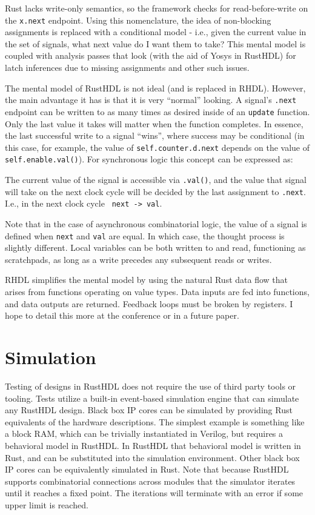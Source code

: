 \documentclass[sigplan,screen,sigconf]{acmart}
\begin{document}
Rust lacks write-only semantics, so the framework checks for read-before-write on the \verb|x.next| endpoint.  Using this nomenclature, the idea of non-blocking assignments is replaced with a conditional model - i.e., given the current value in the set of signals, what next value do I want them to take?  This mental model is coupled with analysis passes that look (with the aid of Yosys\cite{b12} in RustHDL) for latch inferences due to missing assignments and other such issues.

The mental model of RustHDL is not ideal (and is replaced in RHDL).  However, the main advantage it has is that it is very ``normal'' looking.  A signal's \verb|.next| endpoint can be written to as many times as desired inside of an \verb|update| function.  Only the last value it takes will matter when the function completes.  In essence, the last successful write to a signal ``wins'', where success may be conditional (in this case, for example, the value of \verb|self.counter.d.next| depends on the value of 
\verb|self.enable.val()|).  For synchronous logic this concept can be expressed as:

\begin{tcolorbox}
The current value of the signal is accessible via \verb|.val()|, and the value that 
signal will take on the next clock cycle will be decided by the last assignment
to \verb|.next|.  I.e., in the next clock cycle \verb| next -> val|.
\end{tcolorbox}

Note that in the case of asynchronous combinatorial logic, the value of a signal 
is defined when \verb|next| and \verb|val| are equal. In which case, the thought
process is slightly different.  Local variables can be both written to and read, 
functioning as scratchpads, as long as a write precedes any subsequent reads or writes.

RHDL simplifies the mental model by using the natural Rust data flow that arises
from functions operating on value types.  Data inputs are fed into functions, and
data outputs are returned.  Feedback loops must be broken by registers.  I hope
to detail this more at the conference or in a future paper.


\section{Simulation}
Testing of designs in RustHDL does not require the use of third party tools or tooling.  
Tests utilize a built-in event-based simulation engine that can simulate any RustHDL design. Black box IP cores can be simulated by providing Rust equivalents of the hardware descriptions. The simplest example is something like a block RAM, which can be trivially instantiated in Verilog, but requires a behavioral model in RustHDL.  In RustHDL that behavioral model is written in Rust, and can be substituted into the simulation environment.  Other black box IP cores can be equivalently simulated in Rust.  Note that because RustHDL supports combinatorial connections across modules that the simulator iterates until it reaches a fixed point.  The iterations will terminate with an error if some upper limit is reached.
\end{document}
